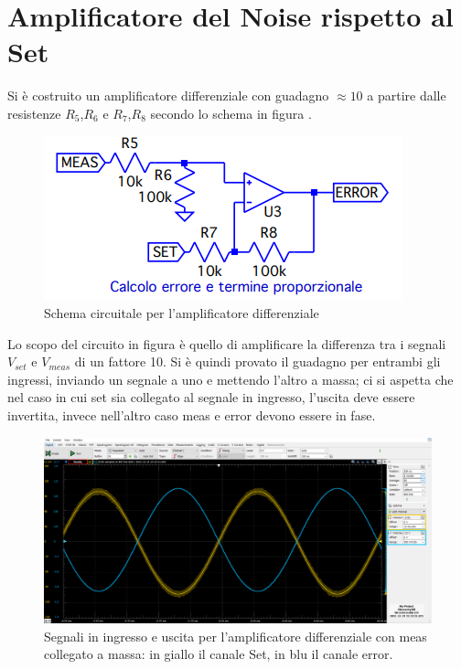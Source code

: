 \documentclass[10pt, a4paper, italian]{article}
\begin{document}
\section{Amplificatore del Noise rispetto al Set}
Si è costruito un amplificatore differenziale con guadagno $\approx 10$ a partire dalle resistenze $R_5$,$R_6$ e $R_7$,$R_8$ secondo lo schema in figura .
\begin{figure}[H]
    \centering
	\includegraphics[scale=0.7]{errorgen}
    \caption{Schema circuitale per l'amplificatore differenziale 
    \label{fig: Draft1}}
\end{figure}
Lo scopo del circuito in figura è quello di amplificare la differenza tra i segnali $V_{set}$ e $V_{meas}$ di un fattore 10.
Si è quindi provato il guadagno per entrambi gli ingressi, inviando un segnale a uno e mettendo l'altro a massa; ci si aspetta che nel caso in cui set sia collegato al segnale in ingresso, l'uscita deve essere invertita, invece nell'altro caso meas e error devono essere in fase.
\begin{figure}[H]
    \centering
	\includegraphics[scale=0.7]{error.set}
    \caption{Segnali in ingresso e uscita per l'amplificatore differenziale con meas collegato a massa: in giallo il canale Set, in blu il canale error.
    \label{fig: Draft1}}
\end{figure}
\end{document}
